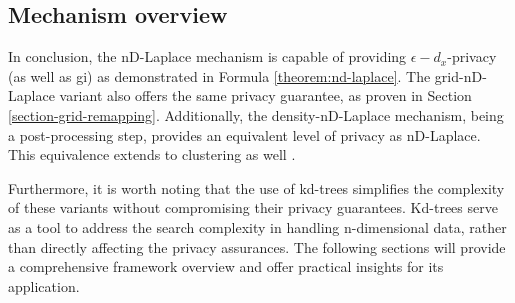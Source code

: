 \subsection{Mechanism overview}
In conclusion, the nD-Laplace mechanism is capable of providing $\epsilon-d_x$-privacy (as well as \gls{gi}) as demonstrated in Formula \ref{theorem:nd-laplace}. The grid-nD-Laplace variant also offers the same privacy guarantee, as proven in Section \ref{section-grid-remapping}. Additionally, the density-nD-Laplace mechanism, being a post-processing step, provides an equivalent level of privacy as nD-Laplace. This equivalence extends to clustering as well \citep{feyisetan_leveraging_2019}.

Furthermore, it is worth noting that the use of kd-trees simplifies the complexity of these variants without compromising their privacy guarantees. Kd-trees serve as a tool to address the search complexity in handling n-dimensional data, rather than directly affecting the privacy assurances.
The following sections will provide a comprehensive framework overview and offer practical insights for its application.

